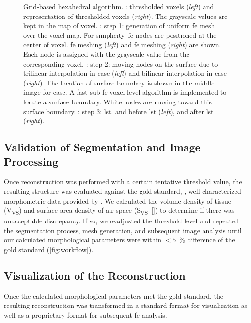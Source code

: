 \begin{figure}[p]
{{			\label{subfig:tsuda-04d}%
		}%
	}%
	\caption[Grid-based hexahedral algorithm]{Grid-based hexahedral algorithm. : \threed thresholded voxels (\emph{left}) and \twod representation of thresholded voxels (\emph{right}). The grayscale values are kept in the map of voxel. : step 1: generation of uniform \acl{fe} mesh over the voxel map. For simplicity, \ac{fe} nodes are positioned at the center of voxel. \threed \ac{fe} meshing (\emph{left}) and \twod \ac{fe} meshing (\emph{right}) are shown. Each node is assigned with the grayscale value from the corresponding voxel. : step 2: moving nodes on the surface due to trilinear interpolation in \threed case (\emph{left}) and bilinear interpolation in \twod case (\emph{right}). The location of surface boundary is shown in the middle image for \twod case. A fast sub \ac{fe}-voxel level algorithm is implemented to locate a surface boundary. White nodes are moving toward this surface boundary. : step 3: \acf{lst}. \threed and \twod before \ac{lst} (\emph{left}), \threed and \twod after \ac{lst} (\emph{right}).}
	\label{fig:tsuda-04}
\end{figure}%

\subsection[Validation of Segmentation \& Image Processing]{Validation of Segmentation and Image Processing}
Once \threed reconstruction was performed with a certain tentative threshold value, the resulting \threed structure was evaluated against the gold standard, \ie, well-characterized morphometric data provided by \citet{Tschanz2003}. We calculated the volume density of tissue (V\textsubscript{VS}) and surface area density of air space (S\textsubscript{VS}~[\centimetresquared\per\centimetrecubed]) to determine if there was unacceptable discrepancy. If so, we readjusted the threshold level and repeated the segmentation process, mesh generation, and subsequent image analysis until our calculated morphological parameters were within $<$\SI{5}{\percent} difference of the gold standard (\autoref{fig:workflow}).

\subsection[Visualization of the Reconstruction]{Visualization of the \threed Reconstruction}
Once the calculated morphological parameters met the gold standard, the resulting \threed reconstruction was transformed in a standard  format for visualization as well as a proprietary  format for subsequent \ac{fe} analysis.

